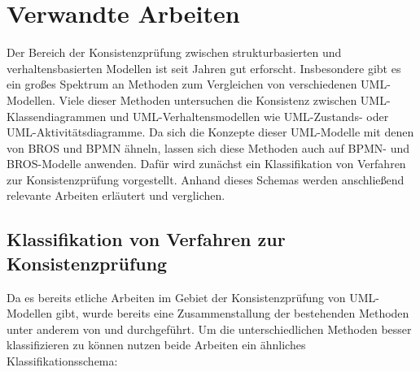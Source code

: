 \chapter{Verwandte Arbeiten}
\label{chap:related_work}

Der Bereich der Konsistenzprüfung zwischen strukturbasierten und verhaltensbasierten Modellen ist seit Jahren gut erforscht.
Insbesondere gibt es ein großes Spektrum an Methoden zum Vergleichen von verschiedenen UML-Modellen.
Viele dieser Methoden untersuchen die Konsistenz zwischen UML-Klassendiagrammen und UML-Verhaltensmodellen wie UML-Zustands- oder UML-Aktivitätsdiagramme.
Da sich die Konzepte dieser UML-Modelle mit denen von BROS und BPMN ähneln, lassen sich diese Methoden auch auf BPMN- und BROS-Modelle anwenden.
Dafür wird zunächst ein Klassifikation von Verfahren zur Konsistenzprüfung vorgestellt.
Anhand dieses Schemas werden anschließend relevante Arbeiten erläutert und verglichen.

\section{Klassifikation von Verfahren zur Konsistenzprüfung}

Da es bereits etliche Arbeiten im Gebiet der Konsistenzprüfung von UML-Modellen gibt, wurde bereits eine Zusammenstallung der bestehenden Methoden unter anderem von \cite{Usman2008} und \cite{Lucas2009} durchgeführt.
Um die unterschiedlichen Methoden besser klassifizieren zu können nutzen beide Arbeiten ein ähnliches Klassifikationsschema:

